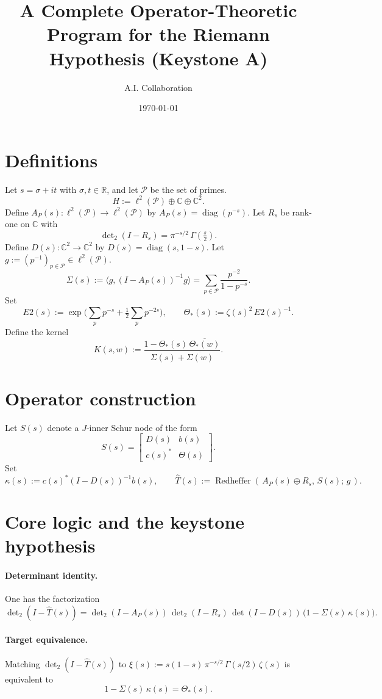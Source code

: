 \documentclass[11pt]{article}
\title{A Complete Operator-Theoretic Program for the Riemann Hypothesis (Keystone A)}
\author{A.I. Collaboration}
\date{\today}
\newcommand{\C}{\mathbb{C}}
\newcommand{\Pset}{\mathcal{P}}
\newcommand{\Th}{\Theta}
\newcommand{\Ths}{\Theta_*}
\newcommand{\Si}{\Sigma}
\newcommand{\detTwo}{\det\nolimits_{2}}
\newcommand{\xiFun}{\xi}
\theoremstyle{plain}
\theoremstyle{definition}
\theoremstyle{remark}
\begin{document}
\maketitle

\section{Definitions}
Let $s=\sigma+it$ with $\sigma,t\in\mathbb{R}$, and let $\Pset$ be the set of primes.
\[
H := \ell^2(\Pset)\oplus \C \oplus \C^2.
\]
Define $A_P(s):\ell^2(\Pset)\to\ell^2(\Pset)$ by $A_P(s)=\operatorname{diag}(p^{-s})$. Let $R_s$ be rank-one on $\C$ with
\[
\detTwo(I - R_s) = \pi^{-s/2}\,\Gamma\!\left(\tfrac{s}{2}\right).
\]
Define $D(s):\C^2\to\C^2$ by $D(s)=\operatorname{diag}(s,1-s)$. Let $g:=(p^{-1})_{p\in\Pset}\in \ell^2(\Pset)$.
\[
\Si(s):=\langle g,(I - A_P(s))^{-1}g\rangle = \sum_{p\in\Pset} \frac{p^{-2}}{1-p^{-s}}.
\]
Set
\[
E2(s):=\exp\Big(\sum_{p} p^{-s}+\tfrac12 \sum_{p} p^{-2s}\Big),\qquad
\Ths(s):=\zeta(s)^2\,E2(s)^{-1}.
\]
Define the kernel
\[
K(s,w):=\frac{1 - \Ths(s)\,\overline{\Ths(w)}}{\Si(s)+\overline{\Si(w)}}.
\]

\section{Operator construction}
Let $S(s)$ denote a $J$-inner Schur node of the form
\[
S(s)=\begin{bmatrix} D(s) & b(s) \\ c(s)^* & \Th(s) \end{bmatrix}.
\]
Set
\[
\kappa(s):=c(s)^* (I - D(s))^{-1} b(s),\qquad
\widehat{T}(s):=\operatorname{Redheffer}(\,A_P(s)\oplus R_s,\, S(s);\, g\,).
\]

\section{Core logic and the keystone hypothesis}
\paragraph{Determinant identity.} One has the factorization
\[
\detTwo(I - \widehat{T}(s)) = \detTwo(I - A_P(s))\,\detTwo(I - R_s)\,\det(I - D(s))\,\big(1 - \Si(s)\,\kappa(s)\big).
\]
\paragraph{Target equivalence.} Matching $\detTwo(I - \widehat{T}(s))$ to $\xiFun(s):=s(1-s)\,\pi^{-s/2}\,\Gamma(s/2)\,\zeta(s)$ is equivalent to
\[
1 - \Si(s)\,\kappa(s) = \Ths(s).
\]
\end{document}
